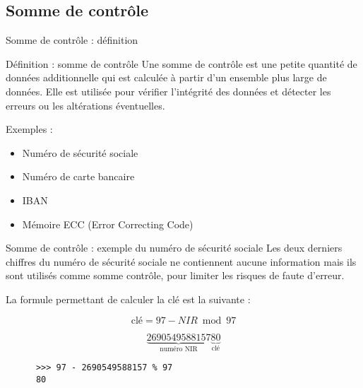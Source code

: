 \subsection*{Somme de contrôle}

\begin{frame}{Somme de contrôle : définition}
  \begin{block}{Définition : somme de contrôle}
    Une somme de contrôle est une petite quantité de données additionnelle qui est calculée à partir d'un ensemble plus large de données. Elle est utilisée pour vérifier l'intégrité des données et détecter les erreurs ou les altérations éventuelles.
  \end{block}

  Exemples :

  \begin{itemize}
    \item Numéro de sécurité sociale
    \item Numéro de carte bancaire
    \item IBAN
    \item Mémoire ECC (Error Correcting Code)
  \end{itemize}
\end{frame}

\begin{frame}[fragile]{Somme de contrôle : exemple du numéro de sécurité sociale}
  Les deux derniers chiffres du numéro de sécurité sociale ne contiennent aucune information mais ils sont utilisés comme somme contrôle, pour limiter les risques de faute d'erreur.

  La formule permettant de calculer la clé est la suivante :

  $$
    \textrm{clé} = 97 - NIR \bmod 97
  $$

  $$
    \underbrace{2 69 05 49 588 157}_{\textrm{numéro NIR}}\underbrace{80}_{\textrm{clé}}
  $$

  \begin{verbatim}
      >>> 97 - 2690549588157 % 97
      80
    \end{verbatim}
\end{frame}